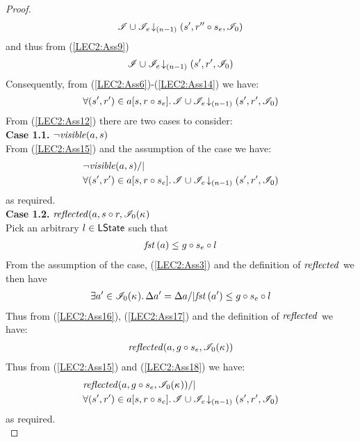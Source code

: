 \begin{lemma}
\begin{proof}
%
\begin{align*}
	\mathscr{I} \cup \mathscr{I}_{e} \!\downarrow_{(n-1)} \left(s', r'' \circ s_e, \mathscr{I}_0\right)
\end{align*}
%
and thus from (\ref{LEC2:Ass9})
%
\begin{align}
	\mathscr{I} \cup \mathscr{I}_{e} \!\downarrow_{(n-1)} \left(s', r', \mathscr{I}_0\right)
	\label{LEC2:Ass14}
\end{align}
%
Consequently, from (\ref{LEC2:Ass6})-(\ref{LEC2:Ass14}) we have:
%
\begin{align}
	\forall (s', r') \in a[s, r \circ s_e].\, \mathscr{I} \cup \mathscr{I}_e \!\downarrow_{(n-1)} \left(s', r', \mathscr{I}_0\right)
	\label{LEC2:Ass15}
\end{align}
%
From (\ref{LEC2:Ass12}) there are two cases to consider:\\
\textbf{Case 1.1. }$\neg\mathit{visible}(a, s)$\\
From (\ref{LEC2:Ass15}) and the assumption of the case we have:
\begin{align*}
	& \neg\mathit{visible}(a, s) /| \\
	& \forall (s', r') \in a[s, r \circ s_e].\, \mathscr{I} \cup \mathscr{I}_e \!\downarrow_{(n-1)} \left(s', r', \mathscr{I}_0\right)
\end{align*}
% 
as required. \\
%
%
%

\noindent\textbf{Case 1.2. }$\mathit{reflected}(a, s \circ r, \mathscr{I}_0(\kappa_{})$\\
Pick an arbitrary $l \in \textsf{LState}$ such that 
\begin{align}
	\mathit{fst}\left(a\right) \leq g \circ s_e \circ l \label{LEC2:Ass16}
\end{align} 
%
From the assumption of the case, (\ref{LEC2:Ass3}) and the definition of $\mathit{reflected}$ we then have
%
\begin{align}
	\exists a' \in \mathscr{I}_0(\kappa_{}).\, \Delta {a'} = \Delta {a} /| \mathit{fst}\left(a'\right) \leq g \circ s_e \circ l \label{LEC2:Ass17}
\end{align}
%
Thus from (\ref{LEC2:Ass16}), (\ref{LEC2:Ass17}) and the definition of $\mathit{reflected}$ we have:
%
\begin{align}
	\mathit{reflected}(a, g \circ s_e, \mathscr{I}_0(\kappa_{}))
	\label{LEC2:Ass18}
\end{align}
%
Thus from (\ref{LEC2:Ass15}) and (\ref{LEC2:Ass18}) we have:
\begin{align*}
	& \mathit{reflected}(a, g \circ s_e, \mathscr{I}_0(\kappa_{})) /| \\
	& \forall (s', r') \in a[s, r \circ s_e].\, \mathscr{I} \cup \mathscr{I}_e \!\downarrow_{(n-1)} \left(s', r', \mathscr{I}_0\right)
\end{align*}
%
as required.\\
%
%
%




\end{proof}
\end{lemma}
